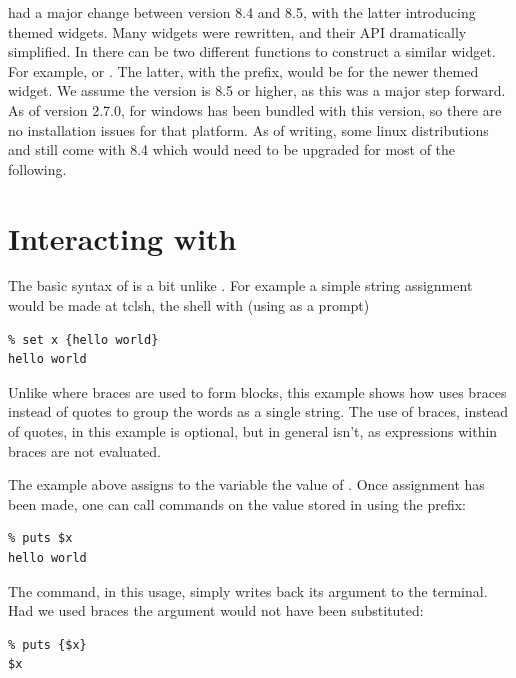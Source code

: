 \TK\/ had a major change between version 8.4 and 8.5, with the latter
introducing themed widgets. Many widgets were rewritten, and their API
dramatically simplified. In  there can be two different
functions to construct a similar widget. For example,
 or . The latter, with the
 prefix, would be for the newer themed widget. We assume the
\TK\/ version is 8.5 or higher, as this was a major step forward. As
of version 2.7.0, \R\/ for windows has been bundled with this \TK\/
version, so there are no installation issues for that platform. As of
writing, some linux distributions and \OSX\/ still come with 8.4 which
would need to be upgraded for most of the following.




\section{Interacting with \TCL}
\label{sec:tcltk:interacting-with-tcl}


The basic syntax of \TCL\/ is a bit unlike \R. For
example a simple string assignment would be made at tclsh, the \TCL\/
shell with (using \code{\%} as a prompt)
\begin{verbatim}
% set x {hello world}
hello world
\end{verbatim}
Unlike \R\/ where braces are used to form blocks, this example shows
how \TCL\/ uses braces instead of quotes to group the words as a
single string. The use of braces, instead of quotes, in this example
is optional, but in general isn't, as expressions within braces are
not evaluated.  

The example above assigns to the variable  the
value of . Once assignment has been made, one can
call commands on the value stored in  using the \code{\$}
prefix:
\begin{verbatim}
% puts $x
hello world
\end{verbatim}
The  command, in this usage, simply writes back its argument to the terminal. Had
we used braces the argument would not have been substituted:
\begin{verbatim}
% puts {$x}
$x
\end{verbatim}

